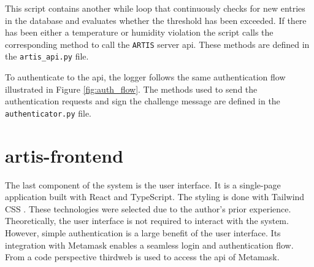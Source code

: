 

This script contains another while loop that continuously checks for new entries in the database and evaluates whether the threshold has been exceeded. If there has been either a temperature or humidity violation the script calls the corresponding method to call the \texttt{ARTIS} server \gls{api}. These methods are defined in the \texttt{artis\_api.py} file.

To authenticate to the \gls{api}, the logger follows the same authentication flow illustrated in Figure \ref{fig:auth_flow}. The methods used to send the authentication requests and sign the challenge message are defined in the \texttt{authenticator.py} file.

\clearpage
\section{artis-frontend}
The last component of the system is the user interface. It is a single-page application built with React \cite{react} and TypeScript. The styling is done with Tailwind CSS \cite{tailwindcss}. These technologies were selected due to the author's prior experience. Theoretically, the user interface is not required to interact with the system. However, simple authentication is a large benefit of the user interface. Its integration with Metamask \cite{metamask} enables a seamless login and authentication flow. From a code perspective thirdweb \cite{thirdweb} is used to access the \gls{api} of Metamask.

